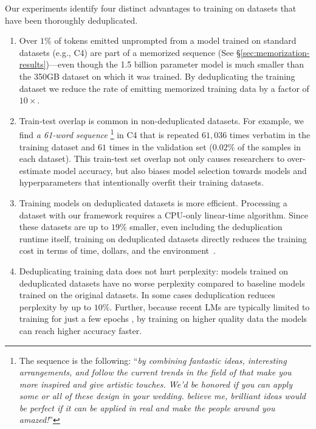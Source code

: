 Our experiments identify four distinct advantages to training on datasets that have been thoroughly deduplicated.
\begin{enumerate}

\item 
Over $1\%$ of tokens emitted unprompted from a model trained on standard datasets (e.g., C4) are part of a memorized sequence (See \S\ref{sec:memorization-results})---even though the 1.5 billion parameter model is much smaller than the 350GB dataset on which it was trained.
By deduplicating the training dataset we reduce the rate of emitting memorized training data by a factor of $10\times$.

\item Train-test overlap is common in non-deduplicated datasets.
For example, we find \emph{a 61-word sequence}%
\footnote{The sequence is the following: ``\textit{by combining fantastic ideas, interesting arrangements, and follow the current trends in the field of that make you more inspired and give artistic touches. We'd be honored if you can apply some or all of these design in your wedding. believe me, brilliant ideas would be perfect if it can be applied in real and make the people around you amazed!}''} 
in C4 \citep{raffel2019exploring} that is repeated $61{,}036$ times verbatim in the training dataset and $61$ times in the validation set ($0.02\%$ of the samples in each dataset).
This train-test set overlap not only causes researchers to over-estimate model accuracy, but also biases model selection towards models and hyperparameters that intentionally overfit their training datasets.

\item Training models on deduplicated datasets is more efficient.
Processing a dataset with our framework requires a CPU-only linear-time algorithm.
Since
these datasets are up to $19\%$ smaller, even including the deduplication runtime itself, training on deduplicated datasets directly reduces the training cost in terms of time, dollars, and the environment~\cite{bender2021stochastic, strubell2019energy, patterson2021carbon}.


\item Deduplicating training data does not hurt perplexity: models trained on deduplicated datasets have no worse perplexity compared to baseline models trained on the original datasets. 
In some cases deduplication reduces perplexity by up to $10\%$.
Further, because recent LMs are typically limited to training for just a few epochs \cite{radford2019language,raffel2019exploring},
by training on higher quality data the models can reach higher accuracy faster.
\end{enumerate}
